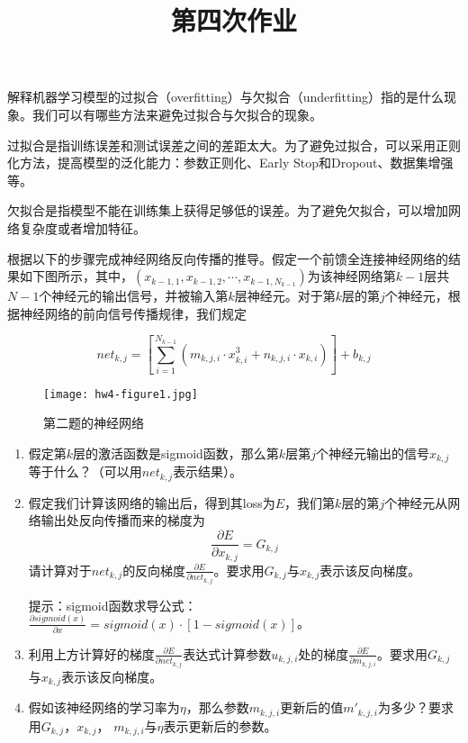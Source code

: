 
    \title{第四次作业}
    \maketitle

    \begin{problem}
        解释机器学习模型的过拟合（overfitting）与欠拟合（underfitting）指的是什么现象。我们可以有哪些方法来避免过拟合与欠拟合的现象。
    \end{problem}

    \begin{solution}
        过拟合是指训练误差和测试误差之间的差距太大。为了避免过拟合，可以采用正则化方法，提高模型的泛化能力：参数正则化、Early Stop和Dropout、数据集增强等。

        欠拟合是指模型不能在训练集上获得足够低的误差。为了避免欠拟合，可以增加网络复杂度或者增加特征。
    \end{solution}

    \begin{problem}
根据以下的步骤完成神经网络反向传播的推导。假定一个前馈全连接神经网络的结果如下图所示，其中，$(x_{k-1, 1}, x_{k-1, 2}, \cdots, x_{k-1, N_{k-1}})$为该神经网络第$k-1$层共$N-1$个神经元的输出信号，并被输入第$k$层神经元。对于第$k$层的第$j$个神经元，根据神经网络的前向信号传播规律，我们规定
    \end{problem}
\begin{equation}
    net_{k,j} = [\sum_{i=1}^{N_{k-1}} (m_{k,j,i}\cdot x_{k, i}^3 + n_{k, j, i}\cdot x_{k, i})] + b_{k, j} 
\end{equation}
\begin{figure}[H]
    \centering
    \texttt{[image: hw4-figure1.jpg]}
    \caption{第二题的神经网络}
\end{figure}

\begin{enumerate}
    \item 假定第$k$层的激活函数是sigmoid函数，那么第$k$层第$j$个神经元输出的信号$x_{k,j}$等于什么？（可以用$net_{k,j}$表示结果）。
    \item 假定我们计算该网络的输出后，得到其loss为$E$，我们第$k$层的第$j$个神经元从网络输出处反向传播而来的梯度为
\begin{equation}
    \frac{\partial E}{\partial x_{k, j}} = G_{k, j}
\end{equation}
    请计算对于$net_{k, j}$的反向梯度$\frac{\partial E}{\partial net_{k, j}}$。要求用$G_{k,j}$与$x_{k,j}$表示该反向梯度。
    
    提示：sigmoid函数求导公式：$\frac{\partial sigmoid(x)}{\partial x} = sigmoid(x)\cdot [1-sigmoid(x)]$。
    \item 利用上方计算好的梯度$\frac{\partial E}{\partial net_{k, j}}$表达式计算参数$u_{k,j,i}$处的梯度$\frac{\partial E}{\partial m_{k,j,i}}$。要求用$G_{k,j}$与$x_{k,j}$表示该反向梯度。
    \item 假如该神经网络的学习率为$\eta$，那么参数$m_{k, j, i}$更新后的值$m'_{k, j, i}$为多少？要求用$G_{k,j}$，$x_{k,j}$， $m_{k, j, i}$与$\eta$表示更新后的参数。
\end{enumerate}

